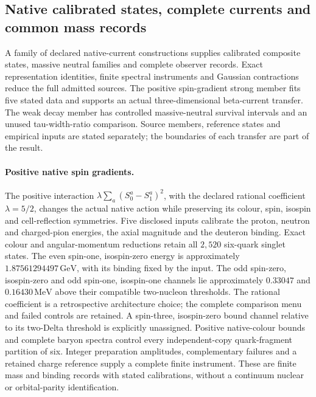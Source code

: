 \subsection{Native calibrated states, complete currents and common mass records}
\label{sec:native-calibrated-currents}

A family of declared native-current constructions supplies calibrated
composite states, massive neutral families and complete observer records.
Exact representation identities, finite spectral instruments and Gaussian
contractions reduce the full admitted sources. The positive spin-gradient
strong member fits five stated data and supports an actual three-dimensional
beta-current transfer. The weak decay member has controlled massive-neutral
survival intervals and an unused tau-width-ratio comparison. Source members,
reference states and empirical inputs are stated separately; the boundaries
of each transfer are part of the result.

\paragraph{Positive native spin gradients.}
The positive interaction
$\lambda\sum_a(S_0^a-S_1^a)^2$, with the declared rational coefficient
$\lambda=5/2$, changes the actual native action while preserving its colour,
spin, isospin and cell-reflection symmetries.
Five disclosed inputs calibrate the proton, neutron and charged-pion
energies, the axial magnitude and the deuteron binding.
Exact colour and angular-momentum reductions retain all $2{,}520$
six-quark singlet states.
The even spin-one, isospin-zero energy is approximately
$1.87561294497\,\mathrm{GeV}$, with its binding fixed by the input.
The odd spin-zero, isospin-zero and odd spin-one, isospin-one channels
lie approximately $0.33047$ and $0.16430\,\mathrm{MeV}$ above their
compatible two-nucleon thresholds.
The rational coefficient is a retrospective architecture choice; the
complete comparison menu and failed controls are retained.
A spin-three, isospin-zero bound channel relative to its two-Delta
threshold is explicitly unassigned.
Positive native-colour bounds and complete baryon spectra control every
independent-copy quark-fragment partition of six.
Integer preparation amplitudes, complementary failures and a retained
charge reference supply a complete finite instrument.
These are finite mass and binding records with stated calibrations,
without a continuum nuclear or orbital-parity identification.

